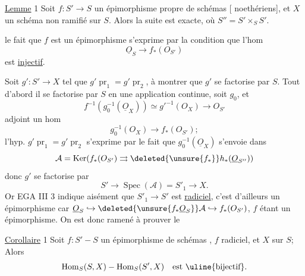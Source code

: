 \uline{Lemme} 1 Soit $f:S'\longrightarrow S$ un épimorphisme propre de schémas [ noethériens], et  $X$ un schéma  non ramifié sur $S$. Alors la suite
est exacte, où $S''=S'\times_S S'$.

 le fait que $f$ est un épimorphisme s'exprime par la condition que l'hom
\[
\underline O_S\longrightarrow f_*(O_{S'})
\]
est \uline{injectif}.

Soit $g':S'\longrightarrow X$ tel que $g'\operatorname{pr}_1=g'\operatorname{pr}_2$, à montrer que $g'$ se factorise par $S$. Tout d'abord il se factorise par $S$ en  une application continue, soit $g_0$, et
\[
f^{-1}(g_0^{-1}(\underline O_X))\simeq g'^{-1}(O_X)\longrightarrow O_{S'}
\]
adjoint un hom
\[
g_0^{-1}(O_X)\longrightarrow f_*(O_{S'});
\]
l'hyp. $g'\operatorname{pr}_1=g'\operatorname{pr}_2$ s'exprime par le fait que $g_0^{-1}(\underline O_X)$ s'envoie dans
\[
\mathcal A=\operatorname{Ker}(f_*(O_{S'})\rightrightarrows\deleted{\unsure{f_*}}h_*(\underline O_{S''}))
\]
donc $g'$ se factorise par
\[
S'\longrightarrow\operatorname{Spec}(\mathcal A)=S'_1\longrightarrow X.
\]
Or EGA III 3 indique aisément que $S'_1\longrightarrow S'$ est  \uline{radiciel}, c'est d'ailleurs un épimorphisme car $\underline O_S\hookrightarrow\deleted{\unsure{f_*\underline O_S}}\mathcal A\hookrightarrow f_*(O_{S'})$, $f$ étant un épimorphisme. On est donc ramené à prouver le

\uline{Corollaire} 1 Soit $f:S'\mathbin{-}S$ un épimorphisme de schémas , $f$   radiciel, et $X$   sur $S$;   Alors
\[
\operatorname{Hom}_S(S,X)\mathbin{-}\operatorname{Hom}_S(S',X)\quad\text{est \uline{bijectif}}.
\]
